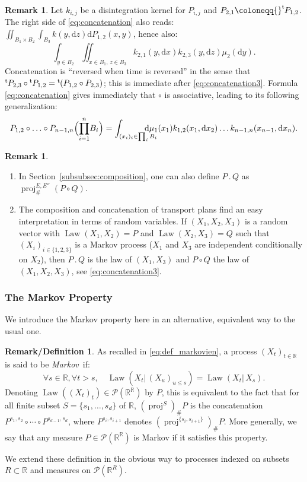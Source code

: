 \documentclass[10pt,a4paper]{article}
\providecommand{\skpt}{\smallskip}
\newcommand{\ldot}{\mathbin{.}}
\theoremstyle{plain}
\theoremstyle{definition}
\newtheorem{remdefi}[them]{Remark/Definition}
\newtheorem{rem}[them]{Remark}
\newcommand{\dd}{\mathrm{d}}
\newcommand{\trans}{{}^{\mathrm{t}}\mkern-1mu}
\newcommand{\eqdefup}{\coloneqq}
\newcommand{\p}{\mathcal{P}}
\newcommand{\R}{\mathbb{R}}
\newcommand{\law}{\operatorname{Law}}
\newcommand{\pr}{\operatorname{proj}}
\begin{document}
\begin{rem} Let $k_{i,j}$ be a disintegration kernel for $P_{i,j}$ and $P_{2,1}\eqdefup\trans P_{1,2}$. The right side of \eqref{eq:concatenation} also reads: $\iint_{B_1\times B_2} \int_{B_3}k(y,\dd z)\dd P_{1,2}(x,y)$, hence also:
\begin{equation}
\int_{y\in B_2} \iint_{x\in B_1,\,z\in B_3}k_{2,1}(y,\dd x)k_{2,3}(y,\dd z)\mu_2(\dd y).\label{eq:concatenation3}
\end{equation}
Concatenation is ``reversed when time is reversed'' in the sense that $\trans P_{2,3}\circ{}\trans P_{1,2}=\trans(P_{1,2}\circ P_{2,3})$; this is immediate after \eqref{eq:concatenation3}. Formula \eqref{eq:concatenation} gives immediately that $\circ$ is associative, leading to its following generalization:
\[P_{1,2}\circ\ldots\circ P_{n-1,n}\Bigl({\prod_{i=1}^n}B_i\Bigr)=\int_{(x_i)_i\in \prod_iB_i}
\hspace{-4ex}\dd\mu_1(x_1)k_{1,2}(x_1,\dd x_2)\ldots k_{n-1,n}(x_{n-1},\dd x_n).\]
\end{rem}

\skpt
\begin{rem}
\begin{enumerate}
\item
In Section~\ref{subsubsec:composition}, one can also define $P\ldot Q$ as $\pr^{E,E''}_\#(P\circ Q)$.

\item
The composition and concatenation of transport plans find an easy interpretation in terms of random variables. If $(X_1,X_2,X_3)$ is a random vector with $\law(X_1,X_2)=P$ and $\law(X_2,X_3)=Q$ such that $(X_i)_{i\in\{1,2,3\}}$ is a Markov process ($X_1$ and $X_3$ are independent conditionally on $X_2$), then $P\ldot Q$ is the law of $(X_1,X_3)$ and $P\circ Q$ the law of $(X_1,X_2,X_3)$, see \eqref{eq:concatenation3}.
\end{enumerate}
\end{rem}

\subsubsection{The Markov Property}

We introduce the Markov property here in an alternative, equivalent way to the usual one.

\begin{remdefi}\label{defi:markov2}As recalled in \eqref{eq:def_markovien}, a process $(X_t)_{t\in\R}$ is said to be \emph{Markov}~if:\vspace*{-3pt}
\[
\forall s\in\R,\forall t>s,\quad \law(X_t|\,(X_{u})_{u\leqslant s})=\law(X_t|\,X_{s}).
\]
Denoting $\law((X_t)_t)\in\p(\R^\R)$ by $P$, this is equivalent to the fact that for all finite subset $S=\{s_1,\ldots,s_d\}$ of $\R$, $(\pr^S)_\#P$ is the concatenation $P^{s_1,s_2}\circ\cdots\circ P^{s_{d-1},s_d}$, where $P^{s_i,s_{i+1}}$ denotes $(\pr^{\{s_i,s_{i+1}\}})_\#P$. More generally, we say that any measure $P\in\p(\R^\R)$ is Markov if it satisfies this property.

We extend these definition in the obvious way to processes indexed on subsets $R\subset \R$ and measures on $\p(\R^R)$.
\end{remdefi}
\end{document}
